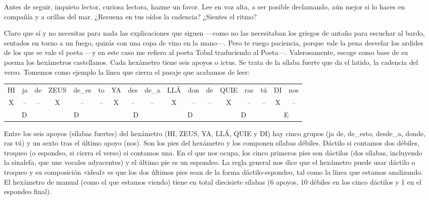 Antes de seguir, inquieto lector, curiosa lectora, hazme un favor. Lee en voz alta, a ser posible declamando, aún mejor si lo haces en compañía y a orillas del mar. ¿Resuena en tus oídos la cadencia? ¿Sientes el ritmo?

Claro que sí y no necesitas para nada las explicaciones que siguen ---como no las necesitaban los griegos de antaño para escuchar al bardo, sentados en torno a un fuego, quizás con una copa de vino en la mano---. Pero te ruego paciencia, porque vale la pena desvelar los ardides de los que se vale el poeta ---y en este caso me refiero al poeta Tobal traduciendo al Poeta---. Valerosamente, escoge como base de su poema los hexámetros castellanos. Cada hexámetro tiene seis apoyos o ictus. Se trata de la sílaba fuerte que da el latido, la cadencia del verso. Tomemos como ejemplo la línea que cierra el pasaje que acabamos de leer:

\begin{center}
\small\setlength{\tabcolsep}{3pt}
\begin{tabular}{ccc|ccc|ccc|ccc|ccc|cc}
HI & ja & de & ZEUS & de\_es & to & YA & des & de\_a & LLÁ & don & de & QUIE & ras & tú & DI & nos \\
X & -- & -- & X & -- & -- & X & -- & -- & X & -- & -- & X & -- & -- & X & -- \\
\multicolumn{3}{c|}{D} & \multicolumn{3}{c|}{D} & \multicolumn{3}{c|}{D} & \multicolumn{3}{c|}{D} & \multicolumn{3}{c|}{D} & \multicolumn{2}{c}{E} \\
\end{tabular}
\end{center}

Entre los seis apoyos (sílabas fuertes) del hexámetro (HI, ZEUS, YA, LLÁ, QUIE y DI) hay cinco grupos (ja de, de\_esto, desde\_a, donde, ras tú) y un sexto tras el último apoyo (nos). Son los pies del hexámetro y los componen sílabas débiles. Dáctilo si contamos dos débiles, troqueo (o espondeo, si cierra el verso) si contamos una. En el que nos ocupa, los cinco primeros pies son dáctilos (dos sílabas, incluyendo la sinalefa, que une vocales adyacentes) y el último pie es un espondeo. La regla general nos dice que el hexámetro puede usar dáctilo o troqueo y su composición «ideal» es que los dos últimos pies sean de la forma dáctilo-espondeo, tal como la línea que estamos analizando. El hexámetro de manual (como el que estamos viendo) tiene en total diecisiete sílabas (6 apoyos, 10 débiles en los cinco dáctilos y 1 en el espondeo final).

